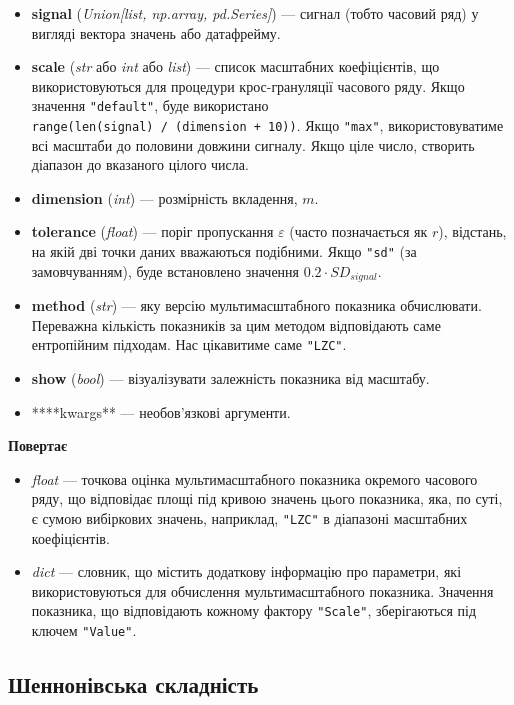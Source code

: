 \documentclass[
  letterpaper,
]{report}
\providecommand{\tightlist}{%
  \setlength{\itemsep}{0pt}\setlength{\parskip}{0pt}}\usepackage{longtable,booktabs,array}
\begin{document}
\begin{itemize}
\tightlist
\item
  \textbf{signal} (\emph{Union{[}list, np.array, pd.Series{]}}) ---
  сигнал (тобто часовий ряд) у вигляді вектора значень або датафрейму.
\item
  \textbf{scale} (\emph{str} або \emph{int} або \emph{list}) --- список
  масштабних коефіцієнтів, що використовуються для процедури
  крос-грануляції часового ряду. Якщо значення \texttt{"default"}, буде
  використано \texttt{range(len(signal)\ /\ (dimension\ +\ 10))}. Якщо
  \texttt{"max"}, використовуватиме всі масштаби до половини довжини
  сигналу. Якщо ціле число, створить діапазон до вказаного цілого числа.
\item
  \textbf{dimension} (\emph{int}) --- розмірність вкладення, \(m\).
\item
  \textbf{tolerance} (\emph{float}) --- поріг пропускання
  \(\varepsilon\) (часто позначається як \(r\)), відстань, на якій дві
  точки даних вважаються подібними. Якщо \texttt{"sd"} (за
  замовчуванням), буде встановлено значення \(0.2 \cdot SD_{signal}\).
\item
  \textbf{method} (\emph{str}) --- яку версію мультимасштабного
  показника обчислювати. Переважна кількість показників за цим методом
  відповідають саме ентропійним підходам. Нас цікавитиме саме
  \texttt{"LZC"}.
\item
  \textbf{show} (\emph{bool}) --- візуалізувати залежність показника від
  масштабу.
\item
  ****kwargs** --- необов'язкові аргументи.
\end{itemize}

\textbf{Повертає}

\begin{itemize}
\tightlist
\item
  \emph{float} --- точкова оцінка мультимасштабного показника окремого
  часового ряду, що відповідає площі під кривою значень цього показника,
  яка, по суті, є сумою вибіркових значень, наприклад, \texttt{"LZC"} в
  діапазоні масштабних коефіцієнтів.
\item
  \emph{dict} --- словник, що містить додаткову інформацію про
  параметри, які використовуються для обчислення мультимасштабного
  показника. Значення показника, що відповідають кожному фактору
  \texttt{"Scale"}, зберігаються під ключем \texttt{"Value"}.
\end{itemize}

\hypertarget{ux448ux435ux43dux43dux43eux43dux456ux432ux441ux44cux43aux430-ux441ux43aux43bux430ux434ux43dux456ux441ux442ux44c}{%
\subsection{Шеннонівська
складність}\label{ux448ux435ux43dux43dux43eux43dux456ux432ux441ux44cux43aux430-ux441ux43aux43bux430ux434ux43dux456ux441ux442ux44c}}
\end{document}
